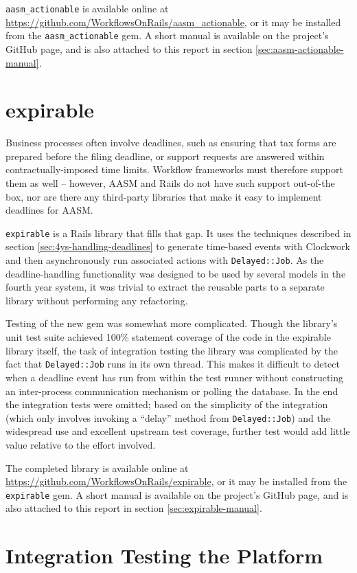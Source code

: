 \documentclass[document.tex]{subfiles}
\begin{document}
\verb!aasm_actionable! is available online at \url{https://github.com/WorkflowsOnRails/aasm_actionable}, or it may be installed from the \verb!aasm_actionable! gem.
A short manual is available on the project's GitHub page, and is also attached to this report in section \ref{sec:aasm-actionable-manual}.

\FloatBarrier


\section {expirable}

Business processes often involve deadlines, such as ensuring that tax forms are prepared before the filing deadline, or support requests are answered within contractually-imposed time limits. Workflow frameworks must therefore support them as well -- however, AASM and Rails do not have such support out-of-the box, nor are there any third-party libraries that make it easy to implement deadlines for AASM.

\verb!expirable! \cite{expirable} is a Rails library that fills that gap. It uses the techniques described in section \ref{sec:4ys-handling-deadlines} to generate time-based events with Clockwork and then asynchronously run associated actions with \verb!Delayed::Job!. As the deadline-handling functionality was designed to be used by several models in the fourth year system, it was trivial to extract the reusable parts to a separate library without performing any refactoring.

Testing of the new gem was somewhat more complicated. Though the library's unit test suite achieved 100\% statement coverage of the code in the expirable library itself, the task of integration testing the library was complicated by the fact that \verb!Delayed::Job! runs in its own thread. This makes it difficult to detect when a deadline event has run from within the test runner without constructing an inter-process communication mechanism or polling the database. In the end the integration tests were omitted; based on the simplicity of the integration (which only involves invoking a ``delay'' method from \verb!Delayed::Job!) and the widespread use and excellent upstream test coverage, further test would add little value relative to the effort involved.

The completed library is available online at \url{https://github.com/WorkflowsOnRails/expirable}, or it may be installed from the \verb!expirable! gem.
A short manual is available on the project's GitHub page, and is also attached to this report in section \ref{sec:expirable-manual}.


\section {Integration Testing the Platform}
\end{document}
